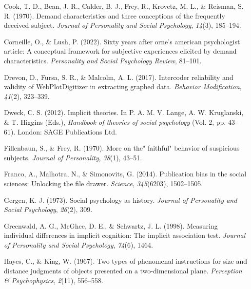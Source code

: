 \documentclass[
  man,floatsintext]{apa6}
\newlength{\cslhangindent}
\newlength{\cslentryspacingunit} %
\newenvironment{CSLReferences}[2] %
 {%
  \setlength{\parindent}{0pt}
  \ifodd #1
  \let\oldpar\par
  \def\par{\hangindent=\cslhangindent\oldpar}
  \fi
  \setlength{\parskip}{#2\cslentryspacingunit}
 }%
 {}
\begin{document}
\begin{CSLReferences}{1}{0}
\leavevmode{}%
Cook, T. D., Bean, J. R., Calder, B. J., Frey, R., Krovetz, M. L., \& Reisman, S. R. (1970). Demand characteristics and three conceptions of the frequently deceived subject. \emph{Journal of Personality and Social Psychology}, \emph{14}(3), 185--194.

\leavevmode{}%
Corneille, O., \& Lush, P. (2022). Sixty years after orne's american psychologist article: A conceptual framework for subjective experiences elicited by demand characteristics. \emph{Personality and Social Psychology Review}, 81--101.

\leavevmode{}%
Drevon, D., Fursa, S. R., \& Malcolm, A. L. (2017). Intercoder reliability and validity of WebPlotDigitizer in extracting graphed data. \emph{Behavior Modification}, \emph{41}(2), 323--339.

\leavevmode{}%
Dweck, C. S. (2012). Implicit theories. In P. A. M. V. Lange, A. W. Kruglanski, \& T. Higgins (Eds.), \emph{Handbook of theories of social psychology} (Vol. 2, pp. 43--61). London: SAGE Publications Ltd.

\leavevmode{}%
Fillenbaun, S., \& Frey, R. (1970). More on the" faithful" behavior of suspicious subjects. \emph{Journal of Personality}, \emph{38}(1), 43--51.

\leavevmode{}%
Franco, A., Malhotra, N., \& Simonovits, G. (2014). Publication bias in the social sciences: Unlocking the file drawer. \emph{Science}, \emph{345}(6203), 1502--1505.

\leavevmode{}%
Gergen, K. J. (1973). Social psychology as history. \emph{Journal of Personality and Social Psychology}, \emph{26}(2), 309.

\leavevmode{}%
Greenwald, A. G., McGhee, D. E., \& Schwartz, J. L. (1998). Measuring individual differences in implicit cognition: The implicit association test. \emph{Journal of Personality and Social Psychology}, \emph{74}(6), 1464.

\leavevmode{}%
Hayes, C., \& King, W. (1967). Two types of phenomenal instructions for size and distance judgments of objects presented on a two-dimensional plane. \emph{Perception \& Psychophysics}, \emph{2}(11), 556--558.


\end{CSLReferences}
\end{document}
